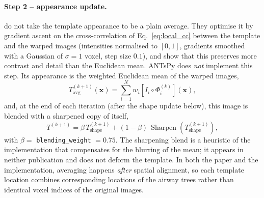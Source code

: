 \paragraph{Step 2 -- appearance update.}  %
\citet{avants2010sygn} do not take the template appearance to be a plain average.
They optimise it by gradient ascent on the cross-correlation of
Eq.~\eqref{eq:local_cc} between the template and the warped images (intensities
normalised to $[0,1]$, gradients smoothed with a Gaussian of $\sigma=1$ voxel,
step size $0.1$), and show that this preserves more contrast and detail than the
Euclidean mean. ANTsPy does \emph{not} implement this step. Its appearance is the
weighted Euclidean mean of the warped images,
\begin{equation}
  T_{\mathrm{avg}}^{(k+1)}(\mathbf{x})
  = \sum_{i=1}^{N} w_i \left[ I_i\circ\Phi_i^{(k)} \right]\!(\mathbf{x}),
  \label{eq:average_registered}  %
\end{equation}
and, at the end of each iteration (after the shape update below), this image is
blended with a sharpened copy of itself,
\begin{equation}
  T^{(k+1)} = \beta\, T^{(k+1)}_{\mathrm{shape}}
  + (1-\beta)\, \operatorname{Sharpen}\!\left(T^{(k+1)}_{\mathrm{shape}}\right),
  \label{eq:blending}            %
\end{equation}
with $\beta=$ \texttt{blending\_weight} $=0.75$. The sharpening blend is a
heuristic of the implementation that compensates for the blurring of the mean; it
appears in neither publication and does not deform the template. In both the
paper and the implementation, averaging happens \emph{after} spatial alignment,
so each template location combines corresponding locations of the airway trees
rather than identical voxel indices of the original images.

